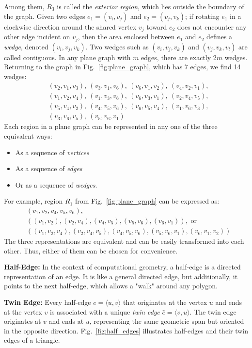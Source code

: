 \documentclass[conference]{IEEEtran}
\begin{document}
Among them, \( R_3 \) is called the \emph{exterior region}, which lies outside the boundary of the graph.
Given two edges \( e_1 = (v_i, v_j) \) and \( e_2 = (v_j, v_k) \); if rotating \( e_1 \) in a clockwise direction around the shared vertex \( v_j \) toward \( e_2 \) does not encounter any other edge incident on \( v_j \), then the area enclosed between \( e_1 \) and \( e_2 \) defines a \emph{wedge}, denoted \( (v_i, v_j, v_k) \). Two wedges such as \( (v_i, v_j, v_k) \) and \( (v_j, v_k, v_l) \) are called contiguous.
In any plane graph with \( m \) edges, there are exactly \( 2m \) wedges. Returning to the graph in Fig.~\ref{fig:plane_graph}, which has 7 edges, we find 14 wedges:
\begin{align*}
& (v_2, v_1, v_3),\ (v_3, v_1, v_6),\ (v_6, v_1, v_2),\ (v_4, v_2, v_1), \\
&  (v_1, v_2, v_4),\ (v_1, v_3, v_6),\ (v_6, v_3, v_1),\ (v_2, v_4, v_5), \\
& (v_5, v_4, v_2),\ (v_4, v_5, v_6),\ (v_6, v_5, v_4),\ (v_1, v_6, v_3), \\
& (v_3, v_6, v_5),\ (v_5, v_6, v_1)
\end{align*}
Each region in a plane graph can be represented in any one of the three equivalent ways:
\begin{itemize}
    \item As a sequence of \emph{vertices}
    \item As a sequence of \emph{edges}
    \item Or as a sequence of \emph{wedges}.
\end{itemize}
For example, region \( R_1 \) from Fig.~\ref{fig:plane_graph} can be expressed as:
\begin{align*}
& (v_1, v_2, v_4, v_5, v_6), \\
& ((v_1, v_2), (v_2, v_4), (v_4, v_5), (v_5, v_6), (v_6, v_1)), \text{ or } \\
& ((v_1, v_2, v_4), (v_2, v_4, v_5), (v_4, v_5, v_6), (v_5, v_6, v_1), (v_6, v_1, v_2))
\end{align*}
The three representations are equivalent and can be easily transformed into each other. Thus, either of them can be chosen for convenience.

\textbf{Half-Edge:} In the context of computational geometry, a half-edge is a directed representation of an edge. It is like a general directed edge, but additionally, it points to the next half-edge, which allows a "walk" around any polygon.

\textbf{Twin Edge:} Every half-edge $e = \langle u, v \rangle$ that originates at the vertex $u$ and ends at the vertex $v$ is associated with a unique \textit{twin edge} $\bar{e} = \langle v, u \rangle$. The twin edge originates at $v$ and ends at $u$, representing the same geometric span but oriented in the opposite direction. Fig.~\ref{fig:half_edges} illustrates half-edges and their twin edges of a triangle.
\end{document}
